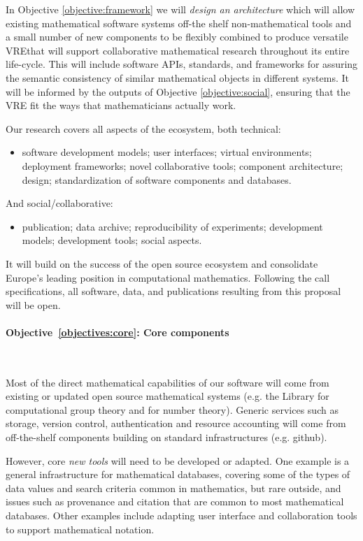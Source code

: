 \documentclass[noworkareas,deliverables,\classoptions]{euproposal}       %
\newcommand{\VREs}{VRE}
\begin{document}
\begin{proposal}
In Objective \ref{objective:framework} we will \emph{design an
  architecture} which will allow existing mathematical software
systems off-the shelf non-mathematical tools and a small number of new
components to be flexibly combined to produce versatile \VREs that will support
collaborative mathematical research throughout its entire
life-cycle. This will include software APIs, standards, and
frameworks for assuring the semantic consistency of similar
mathematical objects in different systems. It will be informed by the
outputs of Objective \ref{objective:social}, ensuring that the \VREs
fit the ways that mathematicians actually work.

Our research covers all aspects of the ecosystem, both technical:
\begin{itemize}
  \item software development models; user
    interfaces; virtual environments; deployment frameworks; novel
    collaborative tools; component architecture; design; 
    standardization of software components and databases. 
\end{itemize}
And social/collaborative:
\begin{itemize}
 \item publication; data archive; reproducibility of experiments;
development models; development tools; social aspects. 
\end{itemize}
It will build on the success of the open source ecosystem and
consolidate Europe's leading position in computational mathematics.
Following the call specifications, all software, data, and
publications resulting from this proposal will be open.

\paragraph{Objective~\ref{objectives:core}: Core components}\

Most of the direct mathematical capabilities of our software will come
from existing or updated open source mathematical systems (e.g. the
\GAP Library for computational group theory and \PariGP for number
theory). Generic services such as storage, version control,
authentication and resource accounting will come from off-the-shelf
components building on standard infrastructures (e.g. github).

However, core \emph{new tools} will need to be developed or
adapted. One example is a general infrastructure for mathematical
databases, covering some of the types of data values and search
criteria common in mathematics, but rare outside, and issues such as
provenance and citation that are common to most mathematical
databases. Other examples include adapting user interface and
collaboration tools to support mathematical notation.


\end{proposal}
\end{document}
